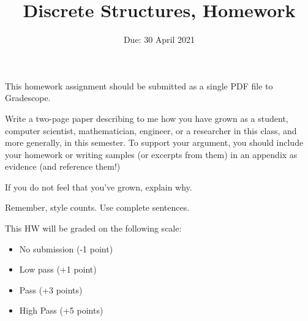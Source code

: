\documentclass{article}
\title{Discrete Structures, Homework \hwnum}
\author{\todo{Put Your Name Here}}
\date{Due: 30 April 2021}
\begin{document}
\maketitle

This homework assignment should be
submitted as a single PDF file to Gradescope.

Write a two-page paper describing to me how you have grown as a student,
computer scientist, mathematician, engineer, or a researcher in this class, and
more generally, in this semester.  To support your argument, you should include
your homework or writing samples (or excerpts from them) in an appendix as
evidence (and reference them!)

If you do not feel that you've grown, explain why.

Remember, style counts. Use complete sentences.

This HW will be graded on the following scale:
\begin{itemize}
    \item No submission (-1 point)
    \item Low pass (+1 point)
    \item Pass (+3 points)
    \item High Pass (+5 points)
\end{itemize}
\end{document}
